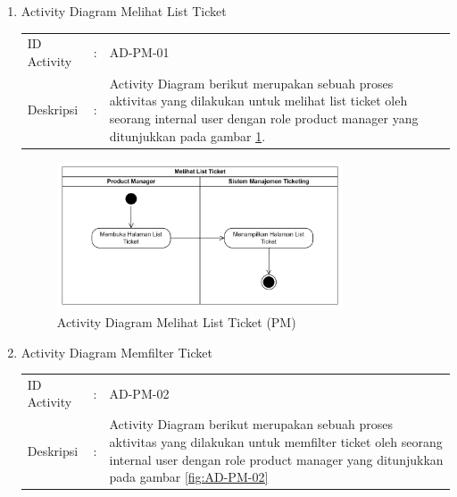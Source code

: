 \documentclass[12pt]{article}
\begin{document}
\begin{enumerate}[label=\textbf{4.\arabic*.}]
\begin{enumerate} [label=\textbf{4.2.\arabic*.}, wide, labelwidth=!, labelindent=0pt]
\begin{enumerate}[label=\textbf{4.2.1.\arabic*.}, wide, labelwidth=!, labelindent=0pt]
            \begin{enumerate}[label=\arabic*.,wide,labelindent=27pt]
                \item Activity Diagram Melihat List Ticket
                
                \hspace*{10pt}
                \begin{tabularx}{.9\linewidth}{@{} l l X @{}}
                    ID Activity & : & AD-PM-01 \\
                    Deskripsi & : &  Activity Diagram berikut merupakan sebuah proses aktivitas yang dilakukan untuk melihat list ticket oleh seorang internal user dengan role product manager yang ditunjukkan pada gambar \ref{fig:AD-PM-01}.
                \end{tabularx}
                

                \begin{figure}[H]
                    \centering \includegraphics[width=0.8\textwidth]{images/activity/ipm/Melihat List Ticket.png}
                    \caption{Activity Diagram Melihat List Ticket (PM)}
                    \label{fig:AD-PM-01}
                \end{figure}

                \item Activity Diagram Memfilter Ticket
                
                \hspace*{10pt}
                \begin{tabularx}{.9\linewidth}{@{} l l X @{}}
                    ID Activity & : & AD-PM-02 \\
                    Deskripsi & : &  Activity Diagram berikut merupakan sebuah proses aktivitas yang dilakukan untuk memfilter ticket oleh seorang internal user dengan role product manager yang ditunjukkan pada gambar \ref{fig:AD-PM-02}
                \end{tabularx}
                

\end{enumerate}
\end{enumerate}
\end{enumerate}
\end{enumerate}
\end{document}
